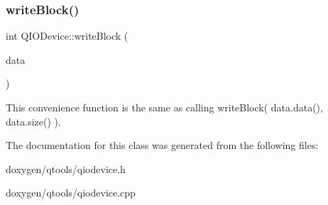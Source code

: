 \mbox{\label{class_q_i_o_device_a17d3fa98dc9e5eab406a6fa728c4b656}} 
\subsubsection{\texorpdfstring{writeBlock()}{writeBlock()}\hspace{0.1cm}{\footnotesize\ttfamily [2/2]}}
{\footnotesize\ttfamily int Q\+I\+O\+Device\+::write\+Block (\begin{DoxyParamCaption}\item[{const \mbox{\hyperlink{class_q_array}{Q\+Byte\+Array}} \&}]{data }\end{DoxyParamCaption})}

This convenience function is the same as calling write\+Block( data.\+data(), data.\+size() ). 

The documentation for this class was generated from the following files\+:\begin{DoxyCompactItemize}
\item 
doxygen/qtools/qiodevice.\+h\item 
doxygen/qtools/qiodevice.\+cpp\end{DoxyCompactItemize}
